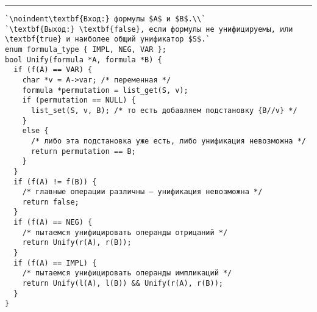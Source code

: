 \vspace{5pt} \hrule
\begin{lstlisting}[caption={Рекурсивная функция Unify}, label=p152_unify, escapechar=`]
`\noindent\textbf{Вход:} формулы $A$ и $B$.\\`
`\textbf{Выход:} \textbf{false}, если формулы не унифицируемы, или \textbf{true} и наиболее общий унификатор $S$.`
enum formula_type { IMPL, NEG, VAR };
bool Unify(formula *A, formula *B) {
  if (f(A) == VAR) {
    char *v = A->var; /* переменная */
    formula *permutation = list_get(S, v);
    if (permutation == NULL) {
      list_set(S, v, B); /* то есть добавляем подстановку {B//v} */
    }
    else {
      /* либо эта подстановка уже есть, либо унификация невозможна */
      return permutation == B;
    }
  }
  if (f(A) != f(B)) {
    /* главные операции различны — унификация невозможна */
    return false;
  }
  if (f(A) == NEG) {
    /* пытаемся унифицировать операнды отрицаний */
    return Unify(r(A), r(B));
  }
  if (f(A) == IMPL) {
    /* пытаемся унифицировать операнды импликаций */
    return Unify(l(A), l(B)) && Unify(r(A), r(B));
  }
}
\end{lstlisting}
